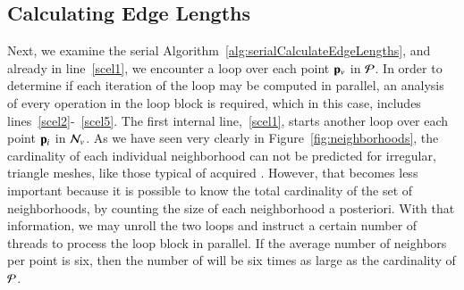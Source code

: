 %
%
%
%
%
%
%
%

%
%
\subsection{Calculating Edge Lengths}
\label{ch5sPAssCEL}
Next, we examine the serial Algorithm~\ref{alg:serialCalculateEdgeLengths}, and already in line~\ref{scel1}, we encounter a loop over each point $\mathbf{p}_v$ in $\mathcal{P}$. In order to determine if each iteration of the loop may be computed in parallel, an analysis of every operation in the loop block is required, which in this case, includes lines~\ref{scel2}-~\ref{scel5}. The first internal line,~\ref{scel1}, starts another loop over each point $\mathbf{p}_i$ in $\mathcal{N}_v$.  As we have seen very clearly in Figure~\ref{fig:neighborhoods}, the cardinality of each individual neighborhood can not be predicted for irregular, triangle meshes, like those typical of acquired \tdd{}. However, that becomes less important because it is possible to know the total cardinality of the set of neighborhoods, by counting the size of each neighborhood a posteriori. With that information, we may unroll the two loops and instruct a certain number of threads to process the loop block in parallel. If the average number of neighbors per point is six, then the number of will be six times as large as the cardinality of $\mathcal{P}$. 

